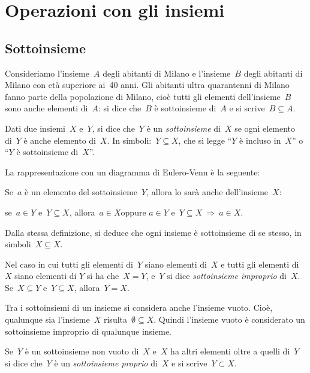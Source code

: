 \chapter{Operazioni con gli insiemi}
\section{Sottoinsieme}

Consideriamo l'insieme~$A$ degli abitanti di Milano e l'insieme~$B$ degli abitanti di Milano
con età superiore ai~40 anni. Gli abitanti ultra quarantenni di Milano fanno parte della popolazione di Milano, cioè tutti gli
elementi dell'insieme~$B$ sono anche elementi di~$A$: si dice che~$B$ è sottoinsieme di~$A$ e si scrive~$B\subseteq A$.

\begin{definizione}
Dati due insiemi~$X$ e~$Y$, si dice che~$Y$ è un \emph{sottoinsieme} di~$X$
se ogni elemento di~$Y$ è anche elemento di~$X$.
In simboli:~$Y\subseteq X$, che si legge
``$Y$ è incluso in~$X$'' o ``$Y$ è sottoinsieme di~$X$''.
\end{definizione}

La rappresentazione con un diagramma di Eulero-Venn è la seguente:
\begin{center}

\end{center}
Se~$a$ è un elemento del sottoinsieme~$Y$, allora lo sarà anche dell'insieme~$X$:
\begin{center}
se~$a\in Y$ e~$Y\subseteq X$, allora~$a\in X$\qquad oppure \qquad $a\in Y$ e~$Y\subseteq X \:\Rightarrow\:a\in X$.
\end{center}

Dalla stessa definizione, si deduce che ogni insieme è sottoinsieme di
se stesso, in simboli~$X\subseteq X$.

Nel caso in cui tutti gli elementi di~$Y$ siano elementi di~$X$ e tutti gli elementi di~$X$ siano elementi di
$Y$ si ha che~$X=Y$, e~$Y$ si dice \emph{sottoinsieme improprio} di~$X$.
Se~$X\subseteq Y$ e~$Y\subseteq X$, allora~$Y=X$.

Tra i sottoinsiemi di un insieme si considera anche
l'insieme vuoto. Cioè, qualunque sia
l'insieme~$X$ risulta~$\emptyset \subseteq X$.
Quindi l'insieme vuoto è considerato un sottoinsieme improprio di qualunque insieme.

Se~$Y$ è un sottoinsieme non vuoto di~$X$ e~$X$ ha altri elementi oltre a quelli di~$Y$
si dice che~$Y$ è un \emph{sottoinsieme proprio} di~$X$ e si scrive~$Y\subset X$.

